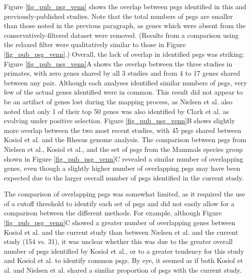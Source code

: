 Figure \ref{fig_pub_psg_venn} shows the overlap between \acp{psg}
identified in this and previously-published studies. Note that the
total numbers of \acp{psg} are smaller than those noted in the
previous paragraph, as genes which were absent from the
conservatively-filtered dataset were removed. (Results from a
comparison using the relaxed filter were qualitatively similar to
those in Figure \ref{fig_pub_psg_venn}.) Overall, the lack of overlap
in identified \acp{psg} was striking: Figure \ref{fig_pub_psg_venn}A
shows the overlap between the three studies in primates, with zero
genes shared by all 3 studies and from 4 to 17 genes shared between
any pair. Although each analyses identified similar numbers of
\acp{psg}, very few of the actual genes identified were in
common. This result did not appear to be an artifact of genes lost
during the mapping process, as Nielsen et al. also noted that only 1
of their top 50 genes was also identified by Clark et
al. \citeyearpar{2003} as evolving under positive selection. Figure
\ref{fig_pub_psg_venn}B shows slightly more overlap between the two
most recent studies, with 45 \acp{psg} shared between Kosiol et
al. and the Rhesus genome analysis. The comparison between \acp{psg}
from Nielsen et al., Kosiol et al., and the set of \psgeone \acp{psg}
from the Mammals species group shown in Figure \ref{fig_pub_psg_venn}C
revealed a similar number of overlapping genes, even though a slightly
higher number of overlapping \acp{psg} may have been expected due to
the larger overall number of \acp{psg} identified in the current
study.

The comparison of overlapping \acp{psg} was somewhat limited, as it
required the use of a cutoff threshold to identify each set of
\acp{psg} and did not easily allow for a comparison between the
different methods. For example, although Figure
\ref{fig_pub_psg_venn}C showed a greater number of overlapping genes
between Kosiol et al. and the current study than between Nielsen et
al. and the current study (154 vs. 31), it was unclear whether this
was due to the greater overall number of \acp{psg} identified by
Kosiol et al., or to a greater tendency for this study and Kosiol et
al. to identify common \acp{psg}. By eye, it seemed as if both Kosiol
et al. and Nielsen et al. shared a similar proportion of \acp{psg}
with the current study.

